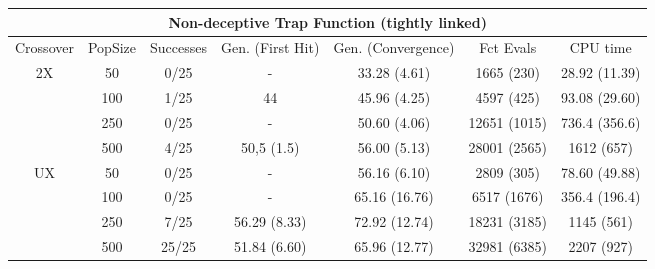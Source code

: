 \documentclass[]{scrartcl}
\begin{document}
\begin{table}
	\small
	\tabcolsep=0.09cm
	\begin{tabular}{|c|c|c|c|c|c|c|}
		\hline
		\multicolumn{7}{|c|}{Non-deceptive Trap Function (tightly linked)}                                               \\ \hline
		Crossover           & PopSize & Successes & Gen. (First Hit) & Gen. (Convergence) & Fct Evals    & CPU time      \\ \hline
		\multirow{4}{*}{2X} & 50      & 0/25      & -                & 33.28 (4.61)       & 1665 (230)   & 28.92 (11.39) \\ \cline{2-7} 
		& 100     & 1/25      & 44               & 45.96 (4.25)       & 4597 (425)   & 93.08 (29.60) \\ \cline{2-7} 
		& 250     & 0/25      & -                & 50.60 (4.06)       & 12651 (1015) & 736.4 (356.6) \\ \cline{2-7} 
		& 500     & 4/25      & 50,5 (1.5)       & 56.00 (5.13)       & 28001 (2565) & 1612 (657)    \\ \hline
		\multirow{4}{*}{UX} & 50      & 0/25      & -                & 56.16 (6.10)       & 2809 (305)   & 78.60 (49.88) \\ \cline{2-7} 
		& 100     & 0/25      & -                & 65.16 (16.76)      & 6517 (1676)  & 356.4 (196.4) \\ \cline{2-7} 
		& 250     & 7/25      & 56.29 (8.33)     & 72.92 (12.74)      & 18231 (3185) & 1145 (561)    \\ \cline{2-7} 
		& 500     & 25/25     & 51.84 (6.60)     & 65.96 (12.77)      & 32981 (6385) & 2207 (927)    \\ \hline
	\end{tabular}
\end{table}
\end{document}
